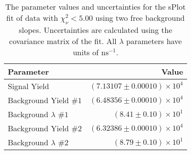 
\begin{table}[ht]
    \begin{center}
        \begin{tabular}{lr}\toprule
            Parameter & Value \\\midrule
            Signal Yield & $(7.13107 \pm 0.00010) \times 10^{4}$ \\
            Background Yield $\#1$ & $(6.48356 \pm 0.00010) \times 10^{4}$ \\
            Background $\lambda$ $\#1$ & $(8.41 \pm 0.10) \times 10^{1}$ \\
            Background Yield $\#2$ & $(6.32386 \pm 0.00010) \times 10^{4}$ \\
            Background $\lambda$ $\#2$ & $(8.79 \pm 0.10) \times 10^{1}$ \\\bottomrule
        \end{tabular}
        \caption{The parameter values and uncertainties for the sPlot fit of data with $\chi^2_\nu < 5.00$ using two free background slopes. Uncertainties are calculated using the covariance matrix of the fit. All $\lambda$ parameters have units of $\si{\nano\second}^{-1}$.}\label{tab:splot-fit-results-chisqdof-5.00-free-2}
    \end{center}
\end{table}
